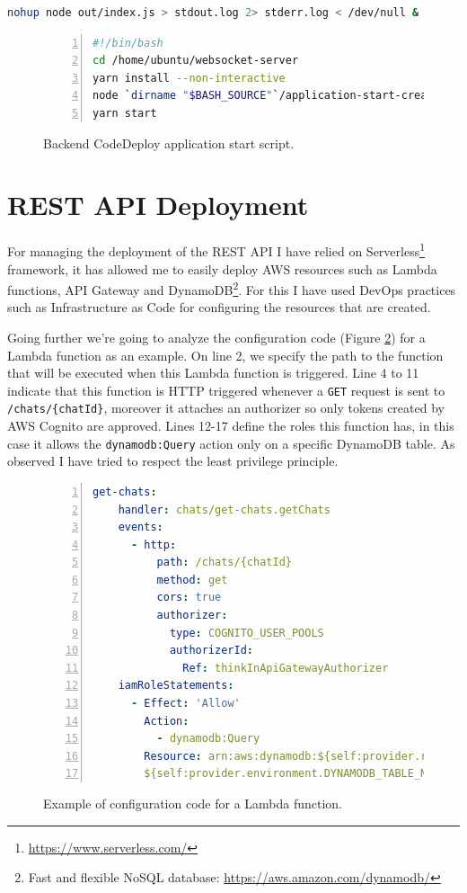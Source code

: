 \begin{lstlisting}[language=bash]
nohup node out/index.js > stdout.log 2> stderr.log < /dev/null &
\end{lstlisting}

\begin{figure}[H]
\begin{lstlisting}[numbers=left,language=bash]
#!/bin/bash
cd /home/ubuntu/websocket-server
yarn install --non-interactive
node `dirname "$BASH_SOURCE"`/application-start-create-env.js
yarn start
\end{lstlisting}
\caption{Backend CodeDeploy application start script.}
\label{figure:cicd-backend-appspec-application-start}
\end{figure}

\section{REST API Deployment}

For managing the deployment of the REST API I have relied on Serverless\footnote{\href{https://www.serverless.com/}{https://www.serverless.com/}} framework, it has allowed me to easily deploy AWS resources such as Lambda functions, API Gateway and DynamoDB\footnote{Fast and flexible NoSQL database: \href{https://aws.amazon.com/dynamodb/}{https://aws.amazon.com/dynamodb/}}. For this I have used DevOps practices such as Infrastructure as Code for configuring the resources that are created.

Going further we're going to analyze the configuration code (Figure \ref{figure:iac-function-example}) for a Lambda function as an example. On line 2, we specify the path to the function that will be executed when this Lambda function is triggered. Line 4 to 11 indicate that this function is HTTP triggered whenever a \verb|GET| request is sent to \verb|/chats/{chatId}|, moreover it attaches an authorizer so only tokens created by AWS Cognito are approved. Lines 12-17 define the roles this function has, in this case it allows the \verb|dynamodb:Query| action only on a specific DynamoDB table. As observed I have tried to respect the least privilege principle.

\begin{figure}[H]
\begin{lstlisting}[numbers=left,language=yaml]
get-chats:
    handler: chats/get-chats.getChats
    events:
      - http:
          path: /chats/{chatId}
          method: get
          cors: true
          authorizer:
            type: COGNITO_USER_POOLS
            authorizerId:
              Ref: thinkInApiGatewayAuthorizer
    iamRoleStatements:
      - Effect: 'Allow'
        Action:
          - dynamodb:Query
        Resource: arn:aws:dynamodb:${self:provider.region}:*:table/
        ${self:provider.environment.DYNAMODB_TABLE_NAME}
\end{lstlisting}
\caption{Example of configuration code for a Lambda function.}
\label{figure:iac-function-example}
\end{figure}